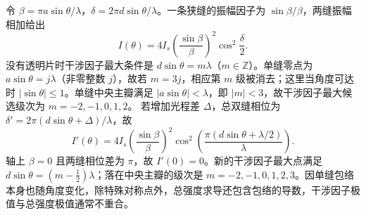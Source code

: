 令 \(\beta=\pi a\sin\theta/\lambda\)，\(\delta=2\pi d\sin\theta/\lambda\)。一条狭缝的振幅因子为 \(\sin\beta/\beta\)，两缝振幅相加给出
\[I(\theta)=4I_s\left(\frac{\sin\beta}{\beta}\right)^2\cos^2\frac\delta2.\]
没有透明片时干涉因子最大条件是 \(d\sin\theta=m\lambda\)（\(m\in\mathbb Z\)）。单缝零点为 \(a\sin\theta=j\lambda\)（非零整数 \(j\)），故若 \(m=3j\)，相应第 \(m\) 级被消去；这里当角度可达时 \(|\sin\theta|\le1\)。单缝中央主瓣满足 \(|a\sin\theta|<\lambda\)，即 \(|m|<3\)，故干涉因子最大候选级次为 \(m=-2,-1,0,1,2\)。
若增加光程差 \(\Delta\)，总双缝相位为 \(\delta'=2\pi(d\sin\theta+\Delta)/\lambda\)，故
\[I'(\theta)=4I_s\left(\frac{\sin\beta}{\beta}\right)^2\cos^2\!\left(\frac{\pi(d\sin\theta+\lambda/2)}{\lambda}\right).\]
轴上 \(\beta=0\) 且两缝相位差为 \(\pi\)，故 \(I'(0)=0\)。新的干涉因子最大点满足 \(d\sin\theta=(m-\tfrac12)\lambda\)；落在中央主瓣的级次是 \(m=-2,-1,0,1,2,3\)。因单缝包络本身也随角度变化，除特殊对称点外，总强度求导还包含包络的导数，干涉因子极值与总强度极值通常不重合。
